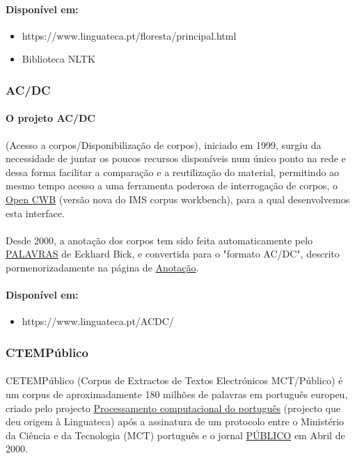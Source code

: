 \documentclass[a4paper, 10pt]{article}
\begin{document}
             \paragraph{Disponível em:}
             \begin{itemize}
				\item https://www.linguateca.pt/floresta/principal.html
				\item Biblioteca NLTK
			\end{itemize}

            \subsubsection{AC/DC}
            	\paragraph{O projeto AC/DC }(Acesso a corpos/Disponibilização de corpos), iniciado em 1999, surgiu da necessidade de juntar os poucos recursos disponíveis num único ponto na rede e dessa forma facilitar a comparação e a reutilização do material, permitindo ao mesmo tempo acesso a uma ferramenta poderosa de interrogação de corpos, o \href{http://cwb.sourceforge.net/}{Open CWB} (versão nova do IMS corpus workbench), para a qual desenvolvemos esta interface.
				\paragraph{}Desde 2000, a anotação dos corpos tem sido feita automaticamente pelo \href{http://visl.sdu.dk/visl/pt/}{PALAVRAS} de Eckhard Bick, e convertida para o "formato AC/DC", descrito pormenorizadamente na página de \href{https://www.linguateca.pt/acesso/anotacao.html}{Anotação}.
				\paragraph{Disponível em:}
				\begin{itemize}
				    \item https://www.linguateca.pt/ACDC/

			    \end{itemize}

            \subsubsection{CTEMPúblico}
            	\paragraph{} CETEMPúblico (Corpus de Extractos de Textos Electrónicos MCT/Público) é um corpus de aproximadamente 180 milhões de palavras em português europeu, criado pelo projecto \href{https://www.linguateca.pt/proc_comp_port.html}{Processamento computacional do português} (projecto que deu origem à Linguateca) após a assinatura de um protocolo entre o Ministério da Ciência e da Tecnologia (MCT) português e o jornal \href{https://www.publico.pt/}{PÚBLICO} em Abril de 2000.
\end{document}
